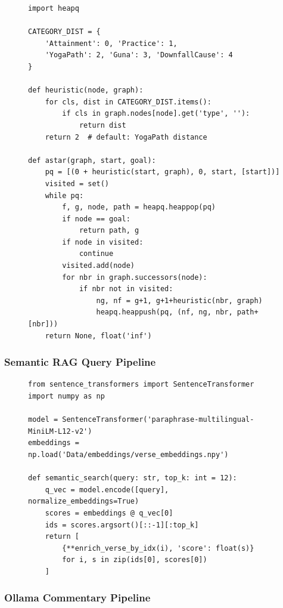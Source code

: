 \documentclass[conference]{IEEEtran}
\begin{document}
\begin{figure}[!t]
\begin{lstlisting}[language=Python3, caption={A* search with philosophical heuristic}]
import heapq

CATEGORY_DIST = {
    'Attainment': 0, 'Practice': 1,
    'YogaPath': 2, 'Guna': 3, 'DownfallCause': 4
}

def heuristic(node, graph):
    for cls, dist in CATEGORY_DIST.items():
        if cls in graph.nodes[node].get('type', ''):
            return dist
    return 2  # default: YogaPath distance

def astar(graph, start, goal):
    pq = [(0 + heuristic(start, graph), 0, start, [start])]
    visited = set()
    while pq:
        f, g, node, path = heapq.heappop(pq)
        if node == goal:
            return path, g
        if node in visited:
            continue
        visited.add(node)
        for nbr in graph.successors(node):
            if nbr not in visited:
                ng, nf = g+1, g+1+heuristic(nbr, graph)
                heapq.heappush(pq, (nf, ng, nbr, path+[nbr]))
    return None, float('inf')
\end{lstlisting}
\end{figure}

\subsubsection{Semantic RAG Query Pipeline}

\begin{figure}[!t]
\begin{lstlisting}[language=Python3, caption={Semantic search: encode, index, retrieve}]
from sentence_transformers import SentenceTransformer
import numpy as np

model = SentenceTransformer('paraphrase-multilingual-MiniLM-L12-v2')
embeddings = np.load('Data/embeddings/verse_embeddings.npy')

def semantic_search(query: str, top_k: int = 12):
    q_vec = model.encode([query], normalize_embeddings=True)
    scores = embeddings @ q_vec[0]
    ids = scores.argsort()[::-1][:top_k]
    return [
        {**enrich_verse_by_idx(i), 'score': float(s)}
        for i, s in zip(ids[0], scores[0])
    ]
\end{lstlisting}
\end{figure}

\subsubsection{Ollama Commentary Pipeline}
\end{document}
